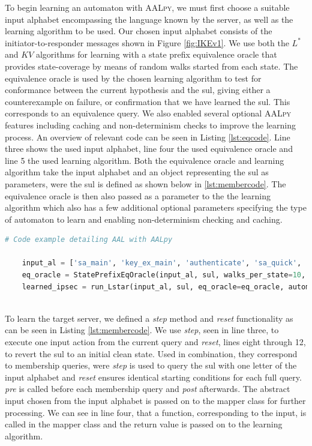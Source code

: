 To begin learning an automaton with \textsc{AALpy}, we must first choose a suitable input alphabet encompassing the language known by the server, as well as the learning algorithm to be used. Our chosen input alphabet consists of the initiator-to-responder messages shown in Figure \ref{fig:IKEv1}. We use both the $L^*$ and $KV$ algorithms for learning with a state prefix equivalence oracle that provides state-coverage by means of random walks started from each state. The equivalence oracle is used by the chosen learning algorithm to test for conformance between the current hypothesis and the \ac{sul}, giving either a counterexample on failure, or confirmation that we have learned the \ac{sul}. This corresponds to an equivalence query. We also enabled several optional \textsc{AALpy} features including caching and non-determinism checks to improve the learning process. An overview of relevant code can be seen in Listing \ref{lst:eqcode}. Line three shows the used input alphabet, line four the used equivalence oracle and line 5 the used learning algorithm. Both the equivalence oracle and learning algorithm take the input alphabet and an object representing the \ac{sul} as parameters, were the \ac{sul} is defined as shown below in \ref{lst:membercode}. The equivalence oracle is then also passed as a parameter to the the learning algorithm which also has a few additional optional parameters specifying the type of automaton to learn and enabling non-determinism checking and caching.

\begin{lstlisting}[float=h, caption=Equivalence Query code, label=lst:eqcode, language=python]
	# Code example detailing AAL with AALpy
	
	input_al = ['sa_main', 'key_ex_main', 'authenticate', 'sa_quick', 'ack_quick']
	eq_oracle = StatePrefixEqOracle(input_al, sul, walks_per_state=10, walk_len=10)
	learned_ipsec = run_Lstar(input_al, sul, eq_oracle=eq_oracle, automaton_type='mealy', cache_and_non_det_check=True)
	
\end{lstlisting}

To learn the target server, we defined a \emph{step} method and \emph{reset} functionality as can be seen in Listing \ref{lst:membercode}. We use \emph{step}, seen in line three, to execute one input action from the current query and \emph{reset}, lines eight through 12, to revert the \ac{sul} to an initial clean state. Used in combination, they correspond to membership queries, were \emph{step} is used to query the \ac{sul} with one letter of the input alphabet and \emph{reset} ensures identical starting conditions for each full query. \emph{pre} is called before each membership query and \emph{post} afterwards. The abstract input chosen from the input alphabet is passed on to the mapper class for further processing. We can see in line four, that a function, corresponding to the input, is called in the mapper class and the return value is passed on to the learning algorithm. \\

